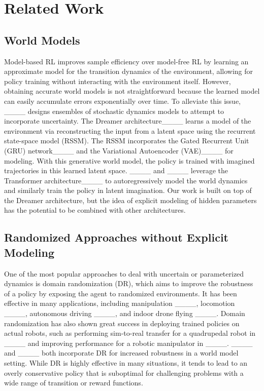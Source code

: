 \section{Related Work}
\subsection{World Models}

Model-based RL improves sample efficiency over model-free RL by learning an approximate model for the transition dynamics of the environment, allowing for policy training without interacting with the environment itself. However, obtaining accurate world models is not straightforward because the learned model can easily accumulate errors exponentially over time. To alleviate this issue, ____ designs ensembles of stochastic dynamics models to attempt to incorporate uncertainty. The Dreamer architecture____ learns a model of the environment via reconstructing the input from a latent space using the recurrent state-space model (RSSM). The RSSM incorporates the Gated Recurrent Unit (GRU) network____ and the Variational Autoencoder (VAE)____ for modeling. With this generative world model, the policy is trained with imagined trajectories in this learned latent space.  ____ and ____ leverage the Transformer architecture____ to autoregressively model the world dynamics and similarly train the policy in latent imagination. 
Our work is built on top of the Dreamer architecture, but the idea of explicit modeling of hidden parameters has the potential to be combined with other architectures.

\subsection{Randomized Approaches without Explicit Modeling}
One of the most popular approaches to deal with uncertain or parameterized dynamics is domain randomization (DR), which aims to improve the robustness of a policy by exposing the agent to randomized environments. It has been effective in many applications, including manipulation ____, locomotion ____, autonomous driving ____, and indoor drone flying ____. 
Domain randomization has also shown great success in deploying trained policies on actual robots, such as performing sim-to-real transfer for a quadrupedal robot in ____ and improving performance for a robotic manipulator in ____. ____ and ____ both incorporate DR for increased robustness in a world model setting. While DR is highly effective in many situations, it tends to lead to an overly conservative policy that is suboptimal for challenging problems with a wide range of transition or reward functions. 

